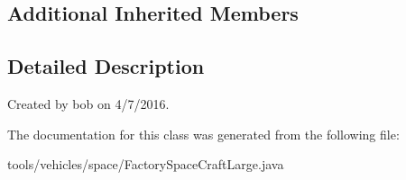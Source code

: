 \subsection*{Additional Inherited Members}


\subsection{Detailed Description}
Created by bob on 4/7/2016. 

The documentation for this class was generated from the following file\+:\begin{DoxyCompactItemize}
\item 
tools/vehicles/space/Factory\+Space\+Craft\+Large.\+java\end{DoxyCompactItemize}
